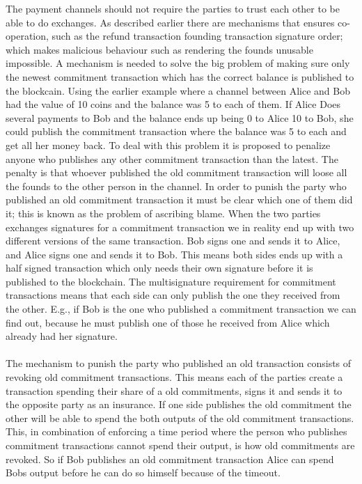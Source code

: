 The payment channels should not require the parties to trust each other to be able to do exchanges.
As described earlier there are mechanisms that ensures co-operation, such as the refund transaction founding transaction signature order; which makes malicious behaviour such as rendering the founds unusable impossible. A mechanism is needed to solve the big problem of making sure only the newest commitment transaction which has the correct balance is published to the blockcain. Using the earlier example where a channel between Alice and Bob had the value of 10 coins and the balance was 5 to each of them. If Alice Does several payments to Bob and the balance ends up being 0 to Alice 10 to Bob, she could publish the commitment transaction where the balance was 5 to each and get all her money back. To deal with this problem it is proposed to penalize anyone who publishes any other commitment transaction than the latest. The penalty is that whoever published the old commitment transaction will loose all the founds to the other person in the channel.
In order to punish the party who published an old commitment transaction it must be clear which one of them did it; this is known as the problem of ascribing blame. When the two parties exchanges signatures for a commitment transaction we in reality end up with two different versions of the same transaction. Bob signs one and sends it to Alice, and Alice signs one and sends it to Bob. This means both sides ends up with a half signed transaction which only needs their own signature before it is published to the blockchain. The multisignature requirement for commitment transactions means that each side can only publish the one they received from the other.
E.g., if Bob is the one who published a commitment transaction we can find out, because he must publish one of those he received from Alice which already had her signature.

\paragraph{}
The mechanism to punish the party who published an old transaction consists of revoking old commitment transactions. This means each of the parties create a transaction spending their share of a old commitments, signs it and sends it to the opposite party as an insurance. If one side publishes the old commitment  the other will be able to spend the both outputs of the old commitment transactions. This, in combination of enforcing a time period where the person who publishes commitment transactions cannot spend their output, is how old commitments are revoked. So if Bob publishes an old commitment transaction Alice can spend Bobs output before he can do so himself because of the timeout.

